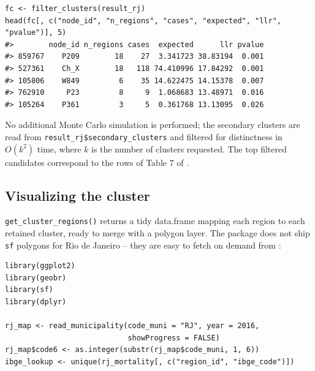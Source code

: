 \begin{verbatim}
fc <- filter_clusters(result_rj)
head(fc[, c("node_id", "n_regions", "cases", "expected", "llr", "pvalue")], 5)
#>        node_id n_regions cases  expected      llr pvalue
#> 859767    P209        18    27  3.341723 38.83194  0.001
#> 527361    Ch_X        18   118 74.410996 17.84292  0.001
#> 105806    W849         6    35 14.622475 14.15378  0.007
#> 762910     P23         8     9  1.068683 13.48971  0.016
#> 105264    P361         3     5  0.361768 13.13095  0.026
\end{verbatim}

No additional Monte Carlo simulation is performed; the secondary clusters
are read from \texttt{result\_rj\$secondary\_clusters} and filtered for distinctness
in \(O(k^2)\) time, where \(k\) is the number of clusters requested. The
top filtered candidates correspond to the rows of Table 7 of
\citet{cancado2025}.

\hypertarget{visualizing-the-cluster}{%
\subsection{Visualizing the cluster}\label{visualizing-the-cluster}}

\texttt{get\_cluster\_regions()} returns a tidy data.frame mapping each region to
each retained cluster, ready to merge with a polygon layer. The package
does not ship \texttt{sf} polygons for Rio de Janeiro -- they are easy to fetch
on demand from :

\begin{verbatim}
library(ggplot2)
library(geobr)
library(sf)
library(dplyr)

rj_map <- read_municipality(code_muni = "RJ", year = 2016,
                            showProgress = FALSE)
rj_map$code6 <- as.integer(substr(rj_map$code_muni, 1, 6))
ibge_lookup <- unique(rj_mortality[, c("region_id", "ibge_code")])
\end{verbatim}

